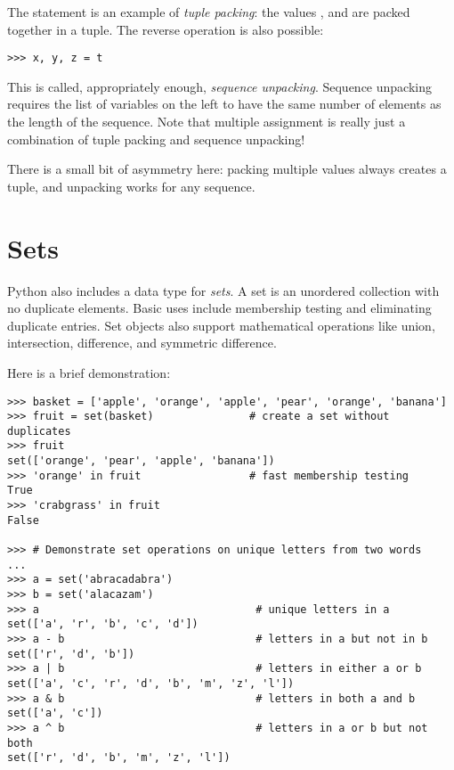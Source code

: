 \documentclass{manual}
\begin{document}
The statement  is an example of
\emph{tuple packing}: the values ,  and
 are packed together in a tuple.  The reverse operation
is also possible:

\begin{verbatim}
>>> x, y, z = t
\end{verbatim}

This is called, appropriately enough, \emph{sequence unpacking}.
Sequence unpacking requires the list of variables on the left to
have the same number of elements as the length of the sequence.  Note
that multiple assignment is really just a combination of tuple packing
and sequence unpacking!

There is a small bit of asymmetry here:  packing multiple values
always creates a tuple, and unpacking works for any sequence.



\section{Sets \label{sets}}

Python also includes a data type for \emph{sets}.  A set is an unordered
collection with no duplicate elements.  Basic uses include membership
testing and eliminating duplicate entries.  Set objects also support
mathematical operations like union, intersection, difference, and
symmetric difference.

Here is a brief demonstration:

\begin{verbatim}
>>> basket = ['apple', 'orange', 'apple', 'pear', 'orange', 'banana']
>>> fruit = set(basket)               # create a set without duplicates
>>> fruit
set(['orange', 'pear', 'apple', 'banana'])
>>> 'orange' in fruit                 # fast membership testing
True
>>> 'crabgrass' in fruit
False

>>> # Demonstrate set operations on unique letters from two words
...
>>> a = set('abracadabra')
>>> b = set('alacazam')
>>> a                                  # unique letters in a
set(['a', 'r', 'b', 'c', 'd'])
>>> a - b                              # letters in a but not in b
set(['r', 'd', 'b'])
>>> a | b                              # letters in either a or b
set(['a', 'c', 'r', 'd', 'b', 'm', 'z', 'l'])
>>> a & b                              # letters in both a and b
set(['a', 'c'])
>>> a ^ b                              # letters in a or b but not both
set(['r', 'd', 'b', 'm', 'z', 'l'])
\end{verbatim}
\end{document}
